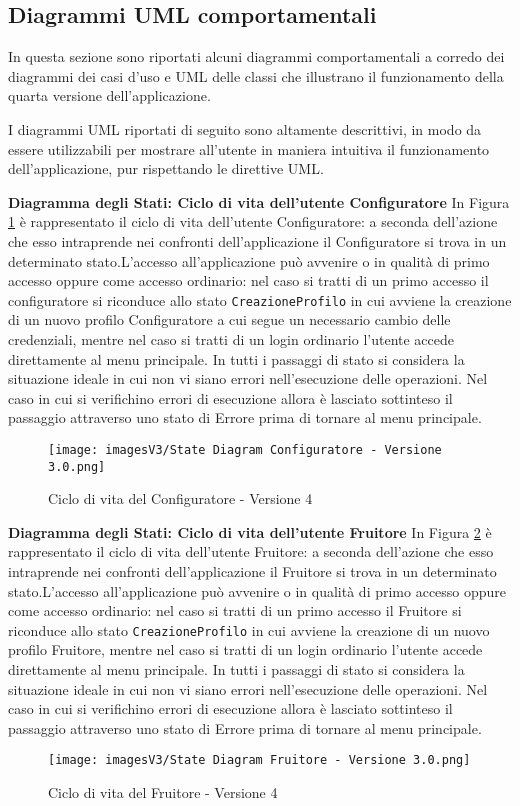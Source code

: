 \newpage
\subsection{Diagrammi UML comportamentali}
In questa sezione sono riportati alcuni diagrammi comportamentali a corredo dei diagrammi dei casi d'uso e UML delle classi che illustrano il funzionamento della quarta versione dell'applicazione.

I diagrammi UML riportati di seguito sono altamente descrittivi, in modo da essere utilizzabili per mostrare all'utente in maniera intuitiva il funzionamento dell'applicazione, pur rispettando le direttive UML.\bigskip

\textbf{Diagramma degli Stati: Ciclo di vita dell'utente Configuratore}\newline
In Figura \ref{fig:State diagram 4.1} è rappresentato il ciclo di vita dell'utente Configuratore: a seconda dell'azione che esso intraprende nei confronti dell'applicazione il Configuratore si trova in un determinato stato.\newline L'accesso all'applicazione può avvenire o in qualità di primo accesso oppure come accesso ordinario: nel caso si tratti di un primo accesso il configuratore si riconduce allo stato \texttt{CreazioneProfilo} in cui avviene la creazione di un nuovo profilo Configuratore a cui segue un necessario cambio delle credenziali, mentre nel caso si tratti di un login ordinario l'utente accede direttamente al menu principale. \newline 
In tutti i passaggi di stato si considera la situazione ideale in cui non vi siano errori nell'esecuzione delle operazioni. Nel caso in cui si verifichino errori di esecuzione allora è lasciato sottinteso il passaggio attraverso uno stato di Errore prima di tornare al menu principale.

\begin{figure}[ht]
\centering
\texttt{[image: imagesV3/State Diagram Configuratore - Versione 3.0.png]}
\caption{\label{fig:State diagram 4.1}Ciclo di vita del Configuratore - Versione 4}
\end{figure}\bigskip

\textbf{Diagramma degli Stati: Ciclo di vita dell'utente Fruitore}\newline
In Figura \ref{fig:State diagram 4.2} è rappresentato il ciclo di vita dell'utente Fruitore: a seconda dell'azione che esso intraprende nei confronti dell'applicazione il Fruitore si trova in un determinato stato.\newline L'accesso all'applicazione può avvenire o in qualità di primo accesso oppure come accesso ordinario: nel caso si tratti di un primo accesso il Fruitore si riconduce allo stato \texttt{CreazioneProfilo} in cui avviene la creazione di un nuovo profilo Fruitore, mentre nel caso si tratti di un login ordinario l'utente accede direttamente al menu principale. \newline 
In tutti i passaggi di stato si considera la situazione ideale in cui non vi siano errori nell'esecuzione delle operazioni. Nel caso in cui si verifichino errori di esecuzione allora è lasciato sottinteso il passaggio attraverso uno stato di Errore prima di tornare al menu principale.

\begin{figure}[t!]
\centering
\texttt{[image: imagesV3/State Diagram Fruitore - Versione 3.0.png]}
\caption{\label{fig:State diagram 4.2}Ciclo di vita del Fruitore - Versione 4}
\end{figure}\bigskip